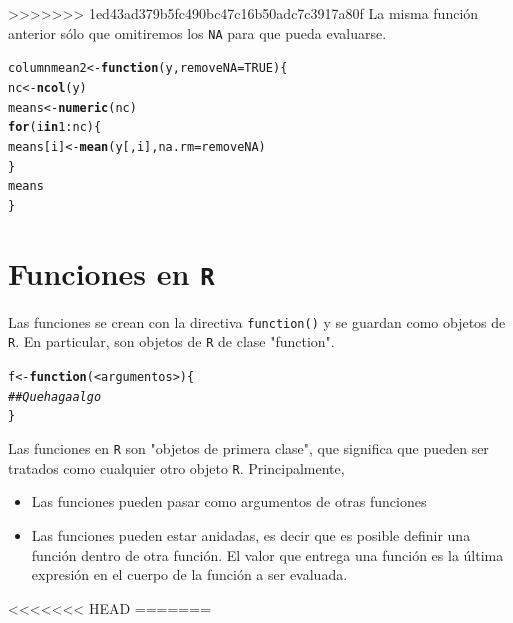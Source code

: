 \documentclass{article}\usepackage[]{graphicx}\usepackage[]{color}
\makeatletter
\newcommand{\hlnum}[1]{\textcolor[rgb]{0.686,0.059,0.569}{#1}}%
\newcommand{\hlcom}[1]{\textcolor[rgb]{0.678,0.584,0.686}{\textit{#1}}}%
\newcommand{\hlopt}[1]{\textcolor[rgb]{0,0,0}{#1}}%
\newcommand{\hlstd}[1]{\textcolor[rgb]{0.345,0.345,0.345}{#1}}%
\newcommand{\hlkwa}[1]{\textcolor[rgb]{0.161,0.373,0.58}{\textbf{#1}}}%
\newcommand{\hlkwb}[1]{\textcolor[rgb]{0.69,0.353,0.396}{#1}}%
\newcommand{\hlkwc}[1]{\textcolor[rgb]{0.333,0.667,0.333}{#1}}%
\newcommand{\hlkwd}[1]{\textcolor[rgb]{0.737,0.353,0.396}{\textbf{#1}}}%
\newenvironment{kframe}{%
 \def\at@end@of@kframe{}%
 \ifinner\ifhmode%
  \def\at@end@of@kframe{\end{minipage}}%
  \begin{minipage}{\columnwidth}%
 \fi\fi%
 \def\FrameCommand##1{\hskip\@totalleftmargin \hskip-\fboxsep
 \colorbox{shadecolor}{##1}\hskip-\fboxsep
     \hskip-\linewidth \hskip-\@totalleftmargin \hskip\columnwidth}%
 \MakeFramed {\advance\hsize-\width
   \@totalleftmargin\z@ \linewidth\hsize
   \@setminipage}}%
 {\par\unskip\endMakeFramed%
 \at@end@of@kframe}
\newenvironment{knitrout}{}{} %
\makeatother
\begin{document}
>>>>>>> 1ed43ad379b5fc490bc47c16b50adc7c3917a80f
La misma función anterior sólo que omitiremos los \texttt{NA} para que pueda evaluarse.
\begin{knitrout}
\color{fgcolor}\begin{kframe}
\begin{alltt}
\hlstd{columnmean2} \hlkwb{<-} \hlkwa{function}\hlstd{(}\hlkwc{y}\hlstd{,} \hlkwc{removeNA} \hlstd{=} \hlnum{TRUE}\hlstd{) \{}
  \hlstd{nc} \hlkwb{<-} \hlkwd{ncol}\hlstd{(y)}
  \hlstd{means} \hlkwb{<-} \hlkwd{numeric}\hlstd{(nc)}
    \hlkwa{for}\hlstd{(i} \hlkwa{in} \hlnum{1}\hlopt{:}\hlstd{nc) \{}
    \hlstd{means[i]} \hlkwb{<-} \hlkwd{mean}\hlstd{(y[, i],} \hlkwc{na.rm} \hlstd{= removeNA)}
    \hlstd{\}}
  \hlstd{means}
\hlstd{\}}
\end{alltt}
\end{kframe}
\end{knitrout}

\section{Funciones en \texttt{R}}
Las funciones se crean con la directiva \texttt{function()} y se guardan como objetos de \texttt{R}. En particular, son objetos de \texttt{R} de clase "function".
\begin{knitrout}
\color{fgcolor}\begin{kframe}
\begin{alltt}
f <- \hlkwd{function}(<argumentos>) \{
\hlcom{  ## Que haga algo  }
\}
\end{alltt}
\end{kframe}
\end{knitrout}

Las funciones en \texttt{R} son "objetos de primera clase", que significa que pueden ser tratados como cualquier otro objeto \texttt{R}. Principalmente,
  \begin{itemize}
    \item Las funciones pueden pasar como argumentos de otras funciones
    \item Las funciones pueden estar anidadas, es decir que es posible definir una función dentro de otra función. El valor que entrega una función es la última expresión en el cuerpo de la función a ser evaluada.
  \end{itemize}
<<<<<<< HEAD
=======
\end{document}
